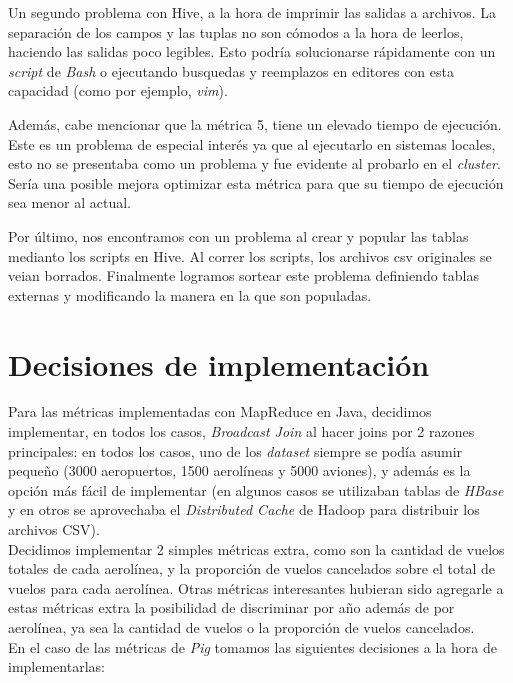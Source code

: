 \documentclass[a4paper,10pt]{article}
\begin{document}
Un segundo problema con Hive, a la hora de imprimir las salidas a archivos. La separación de los campos y las tuplas no son cómodos a la hora de leerlos, haciendo las salidas poco legibles. Esto podría solucionarse rápidamente con un \textit{script} de \textit{Bash} o ejecutando busquedas y reemplazos en editores con esta capacidad (como por ejemplo, \textit{vim}).

Además, cabe mencionar que la métrica 5, tiene un elevado tiempo de ejecución. Este es un problema de especial interés ya que al ejecutarlo en sistemas locales, esto no se presentaba como un problema y fue evidente al probarlo en el \textit{cluster}. Sería una posible mejora optimizar esta métrica para que su tiempo de ejecución sea menor al actual.

Por último, nos encontramos con un problema al crear y popular las tablas medianto los scripts en Hive. Al correr los scripts, los archivos csv originales se veian borrados. Finalmente logramos sortear este problema definiendo tablas externas y modificando la manera en la que son populadas.

\section{Decisiones de implementación}

Para las métricas implementadas con MapReduce en Java, decidimos implementar, en todos los casos, \textit{Broadcast Join} al hacer joins por 2 razones principales: en todos los casos,
uno de los \textit{dataset} siempre se podía asumir pequeño (3000 aeropuertos, 1500 aerolíneas y 5000 aviones), y además es la opción más fácil de implementar (en algunos casos se
utilizaban tablas de \textit{HBase} y en otros se aprovechaba el \textit{Distributed Cache} de Hadoop para distribuir los archivos CSV).\\

Decidimos implementar 2 simples métricas extra, como son la cantidad de vuelos totales de cada aerolínea, y la proporción de vuelos cancelados sobre el total de vuelos para cada
aerolínea. Otras métricas interesantes hubieran sido agregarle a estas métricas extra la posibilidad de discriminar por año además de por aerolínea, ya sea la cantidad de vuelos
o la proporción de vuelos cancelados.\\

En el caso de las métricas de \textit{Pig} tomamos las siguientes decisiones a la hora de implementarlas:\\
\end{document}
